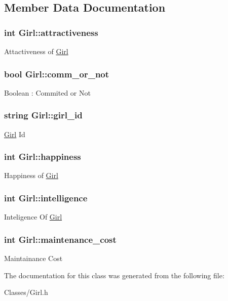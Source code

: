 \subsection{Member Data Documentation}
\hypertarget{class_girl_ab97bd68f8bc0ab5ee3fb9d2784ed1474}{
\subsubsection[{attractiveness}]{\setlength{\rightskip}{0pt plus 5cm}int Girl\-::attractiveness}}\label{class_girl_ab97bd68f8bc0ab5ee3fb9d2784ed1474}
Attactiveness of \hyperlink{class_girl}{Girl} \hypertarget{class_girl_a2ca3116e88a8f4a91b242eabf3a66603}{
\subsubsection[{comm\-\_\-or\-\_\-not}]{\setlength{\rightskip}{0pt plus 5cm}bool Girl\-::comm\-\_\-or\-\_\-not}}\label{class_girl_a2ca3116e88a8f4a91b242eabf3a66603}
Boolean \-: Commited or Not \hypertarget{class_girl_a94e1817f90da8bc51ce59df0662e05a7}{
\subsubsection[{girl\-\_\-id}]{\setlength{\rightskip}{0pt plus 5cm}string Girl\-::girl\-\_\-id}}\label{class_girl_a94e1817f90da8bc51ce59df0662e05a7}
\hyperlink{class_girl}{Girl} Id \hypertarget{class_girl_a50337447735a8f518fd817338d04d5b9}{
\subsubsection[{happiness}]{\setlength{\rightskip}{0pt plus 5cm}int Girl\-::happiness}}\label{class_girl_a50337447735a8f518fd817338d04d5b9}
Happiness of \hyperlink{class_girl}{Girl} \hypertarget{class_girl_a751f8b9d8f1ba139d3f512eb198c16f4}{
\subsubsection[{intelligence}]{\setlength{\rightskip}{0pt plus 5cm}int Girl\-::intelligence}}\label{class_girl_a751f8b9d8f1ba139d3f512eb198c16f4}
Inteligence Of \hyperlink{class_girl}{Girl} \hypertarget{class_girl_a6228b481bb77e727ed5538a2d5f71400}{
\subsubsection[{maintenance\-\_\-cost}]{\setlength{\rightskip}{0pt plus 5cm}int Girl\-::maintenance\-\_\-cost}}\label{class_girl_a6228b481bb77e727ed5538a2d5f71400}
Maintainance Cost 

The documentation for this class was generated from the following file\-:\begin{DoxyCompactItemize}
\item 
Classes/Girl.\-h\end{DoxyCompactItemize}
